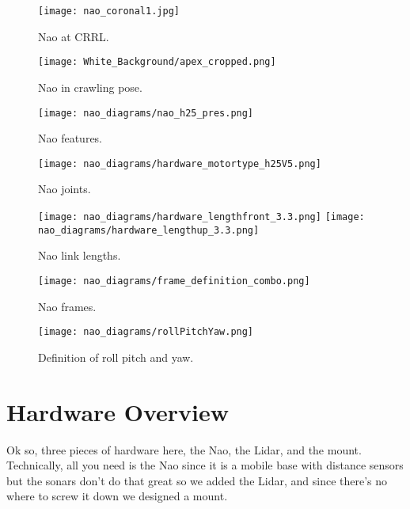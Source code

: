 \begin{figure}
\centering
\texttt{[image: nao\_coronal1.jpg]}
\caption{Nao at CRRL.}
\label{fig:crrl_nao_coronal1}
\end{figure}

\begin{figure}
\centering
\texttt{[image: White\_Background/apex\_cropped.png]}
\caption{Nao in crawling pose.}
\label{fig:crrl_nao_apex1}
\end{figure}

\begin{figure}
\centering
\texttt{[image: nao\_diagrams/nao\_h25\_pres.png]}
\caption{Nao features.}
\label{fig:nao_features1}
\end{figure}

\begin{figure}
\centering
\texttt{[image: nao\_diagrams/hardware\_motortype\_h25V5.png]}
\caption{Nao joints.}
\label{fig:nao_joints1}
\end{figure}

\begin{figure}
\centerline{\texttt{[image: nao\_diagrams/hardware\_lengthfront\_3.3.png]}
            \texttt{[image: nao\_diagrams/hardware\_lengthup\_3.3.png]}
}
\caption{Nao link lengths.}
\label{fig:nao_link_lengths1}
\end{figure}

\begin{figure}
\centering
\texttt{[image: nao\_diagrams/frame\_definition\_combo.png]}
\caption{Nao frames.}
\label{fig:nao_frames1}
\end{figure}

\begin{figure}
\centerline{\texttt{[image: nao\_diagrams/rollPitchYaw.png]}
}
\caption{Definition of roll pitch and yaw.}
\label{fig:nao_rpy_def1}
\end{figure}

\section{Hardware Overview}
Ok so, three pieces of hardware here, the Nao, the Lidar, and the mount.
Technically, all you need is the Nao since it is a mobile base with distance sensors but the sonars
don't do that great so we added the Lidar, and since there's no where to screw it down we designed a mount.


